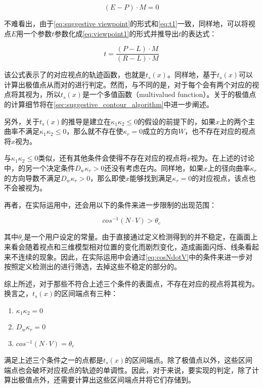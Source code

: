 \begin{equation}\label{eq:suggestive viewpoint}
    {(E - P)}\cdot{M} = 0
\end{equation}

不难看出，由于\autoref{eq:suggestive viewpoint}的形式和\autoref{eq:t1}一致，同样地，可以将视点$E$用一个参数$t$参数化成\autoref{eq:viewpoint1}的形式并推导出$t$的表达式：

\begin{equation}\label{eq:suggestive trajectory}
    t = \frac{(P-L)\cdot{M}}{(R-L)\cdot{M}}
\end{equation}

该公式表示了\scon{}的对应视点的轨迹函数，也就是$t_s(x)$。同样地，基于$t_s(x)$可以计算出极值点从而对\scon{}的\epsl{}进行判定。然而，与\con{}不同的是，对于每个\sconp{}会有两个对应的视点将其视为\sconp{}，所以$t_s(x)$是一个多值函数（multivalued function）。关于\scon{}的极值点的计算细节将在\ref{sec:suggestive_contour_algorithm}中进一步阐述。

另外，关于$t_s(x)$的推导是建立在$\kappa_1\kappa_2 \leq 0$的假设的前提下的，如果$x$上的两个主曲率不满足$\kappa_1\kappa_2 \leq 0$，那么就不存在使$\kappa_r = 0$成立的方向$W$，也不存在对应的视点将$x$视为\sconp{}。

与$\kappa_1\kappa_2 \leq 0$类似，还有其他条件会使得不存在对应的视点将$x$视为\sconp{}。在上述的讨论中，\scon{}的另一个决定条件$D_w\kappa_r>0$还没有考虑在内。同样地，如果$x$上的径向曲率$\kappa_r$的方向导数不满足$D_w\kappa_r>0$，那么即使$x$能够找到满足$\kappa_r = 0$的对应视点，该点也不会被视为\sconp{}。

再者，在实际运用中，还会用以下的条件来进一步限制\scon{}的出现范围：

\begin{equation}\label{eq:cosNdotV}
  cos^{-1}(N\cdot{V}) > \theta_c 
\end{equation}

其中$\theta_c$是一个用户设定的常量。由于直接通过定义检测得到的\scon{}并不稳定，在画面上来看会随着视点和三维模型相对位置的变化而剧烈变化，造成画面闪烁、线条看起来不连续的现象。因此，在实际运用中会通过\autoref{eq:cosNdotV}中的条件来进一步对按照定义检测出的\scon{}进行筛选，去掉这些不稳定的部分的\sconp{}。

综上所述，对于那些不符合上述三个条件的表面点，不存在对应的视点将其视为\sconp{}。换言之，$t_s(x)$的区间端点有三种：

\begin{enumerate}
\item $\kappa_1\kappa_2 = 0$
\item $D_w\kappa_r = 0$
\item $cos^{-1}(N\cdot{V}) = \theta_c$
\end{enumerate}

满足上述三个条件之一的点都是$t_s(x)$的区间端点。除了极值点以外，这些区间端点也会破坏对应视点的轨迹的单调性。因此，对于\scon{}来说，要实现\epsl{}的判定，除了计算出极值点外，还需要计算出这些区间端点并将它们存储到\ppll{}。
